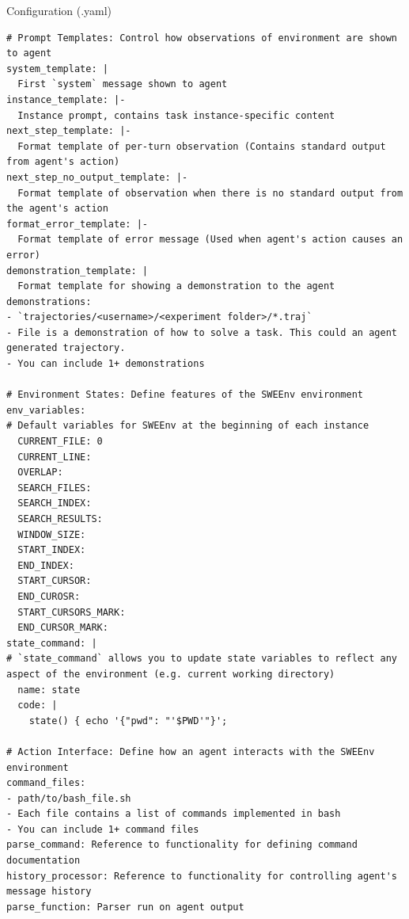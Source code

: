 {
\begin{fileviewerbox}{Configuration (.yaml)}
\begin{Verbatim}[breaklines=true]
# Prompt Templates: Control how observations of environment are shown to agent
system_template: |
  First `system` message shown to agent
instance_template: |-
  Instance prompt, contains task instance-specific content
next_step_template: |-
  Format template of per-turn observation (Contains standard output from agent's action)
next_step_no_output_template: |-
  Format template of observation when there is no standard output from the agent's action
format_error_template: |-
  Format template of error message (Used when agent's action causes an error)
demonstration_template: |
  Format template for showing a demonstration to the agent
demonstrations:
- `trajectories/<username>/<experiment folder>/*.traj` 
- File is a demonstration of how to solve a task. This could an agent generated trajectory.
- You can include 1+ demonstrations

# Environment States: Define features of the SWEEnv environment
env_variables:
# Default variables for SWEEnv at the beginning of each instance
  CURRENT_FILE: 0
  CURRENT_LINE:
  OVERLAP:
  SEARCH_FILES:
  SEARCH_INDEX:
  SEARCH_RESULTS:
  WINDOW_SIZE:
  START_INDEX:
  END_INDEX:
  START_CURSOR:
  END_CUROSR:
  START_CURSORS_MARK:
  END_CURSOR_MARK:
state_command: |
# `state_command` allows you to update state variables to reflect any aspect of the environment (e.g. current working directory)
  name: state
  code: |
    state() { echo '{"pwd": "'$PWD'"}';

# Action Interface: Define how an agent interacts with the SWEEnv environment
command_files:
- path/to/bash_file.sh
- Each file contains a list of commands implemented in bash
- You can include 1+ command files
parse_command: Reference to functionality for defining command documentation
history_processor: Reference to functionality for controlling agent's message history
parse_function: Parser run on agent output
\end{Verbatim}
\end{fileviewerbox}
\captionsetup{type=figure}
\label{fig.prompts.example_configuration}
}